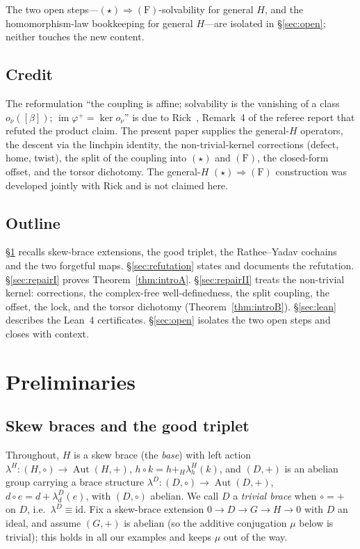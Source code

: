 \documentclass[11pt,reqno]{amsart}
\theoremstyle{plain}
\theoremstyle{definition}
\newcommand{\id}{\mathrm{id}}
\newcommand{\im}{\operatorname{im}}
\newcommand{\Aut}{\operatorname{Aut}}
\newcommand{\lD}{\lambda^{D}}
\newcommand{\lH}{\lambda^{H}}
\begin{document}
\noindent The two open steps---$(\star)\Rightarrow\mathrm{(F)}$-solvability for general
$H$, and the homomorphism-law bookkeeping for general $H$---are isolated in
\S\ref{sec:open}; neither touches the new content.

\subsection*{Credit}
The reformulation ``the coupling is affine; solvability is the vanishing of a class
$o_\nu([\beta])$; $\im\varphi^{+}=\ker o_\nu$'' is due to Rick~\cite{RickRef}, Remark~4 of
the referee report that refuted the product claim. The present paper supplies the
general-$H$ operators, the descent via the linchpin identity, the non-trivial-kernel
corrections (defect, home, twist), the split of the coupling into $(\star)$ and
$\mathrm{(F)}$, the closed-form offset, and the torsor dichotomy. The general-$H$
$(\star)\Rightarrow\mathrm{(F)}$ construction was developed jointly with Rick and is not
claimed here.

\subsection*{Outline}
\S\ref{sec:prelim} recalls skew-brace extensions, the good triplet, the Rathee--Yadav
cochains and the two forgetful maps. \S\ref{sec:refutation} states and documents the
refutation. \S\ref{sec:repairI} proves Theorem~\ref{thm:introA}. \S\ref{sec:repairII}
treats the non-trivial kernel: corrections, the complex-free well-definedness, the split
coupling, the offset, the lock, and the torsor dichotomy (Theorem~\ref{thm:introB}).
\S\ref{sec:lean} describes the Lean~4 certificates. \S\ref{sec:open} isolates the two open
steps and closes with context.

\section{Preliminaries}\label{sec:prelim}

\subsection{Skew braces and the good triplet}
Throughout, $H$ is a skew brace (the \emph{base}) with left action
$\lH\colon(H,\circ)\to\Aut(H,+)$, $h\circ k=h+_H\lH_h(k)$, and $(D,+)$ is an abelian group
carrying a brace structure $\lD\colon(D,\circ)\to\Aut(D,+)$, $d\circ e=d+\lD_d(e)$, with
$(D,\circ)$ abelian. We call $D$ a \emph{trivial brace} when $\circ=+$ on $D$, i.e.\
$\lD\equiv\id$. Fix a skew-brace extension $0\to D\to G\to H\to0$ with $D$ an ideal, and
assume $(G,+)$ is abelian (so the additive conjugation $\mu$ below is trivial); this holds
in all our examples and keeps $\mu$ out of the way.
\end{document}
